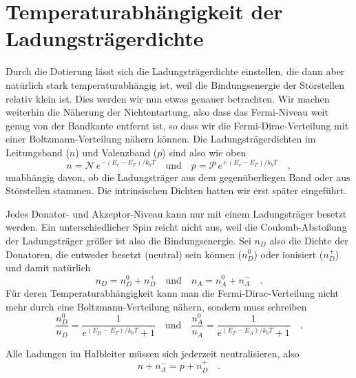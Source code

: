 \section{Temperaturabhängigkeit der Ladungsträgerdichte}

Durch die Dotierung lässt sich die Ladungsträgerdichte einstellen, die dann aber natürlich stark temperaturabhängig ist, weil die Bindungsenergie der Störstellen relativ klein ist. Dies werden wir nun etwas genauer betrachten. Wir machen weiterhin die Näherung der Nichtentartung, also dass das Fermi-Niveau weit genug von der Bandkante entfernt ist, so dass wir die Fermi-Dirac-Verteilung mit einer Boltzmann-Verteilung nähern können. Die Ladungsträgerdichten im Leitungsband ($n$) und Valenzband ($p$) sind also wie oben
\begin{equation}
    n  = \mathcal{N} \, e^{- (E_c - E_F) / k_b T} \quad \text{und} \quad   
    p =  \mathcal{P} \, e^{+ (E_v - E_F) / k_b T} \quad , \label{eq:5_np_eff}
\end{equation}
unabhängig davon, ob die Ladungsträger aus dem gegenüberliegen Band oder aus Störstellen stammen. Die intrinsischen Dichten hatten wir erst später eingeführt.

Jedes Donator- und Akzeptor-Niveau kann nur mit einem Ladungsträger besetzt werden. Ein unterschiedlicher Spin reicht nicht aus, weil die Coulomb-Abstoßung der Ladungsträger größer ist also die Bindungsenergie. Sei $n_D$ also die Dichte der Donatoren, die entweder besetzt (neutral) sein können ($n_D^0$) oder ionisiert  ($n_D^+$) und damit natürlich
\begin{equation}
    n_D = n_D^0 + n_D^+ \quad \text{und} \quad   n_A = n_A^0 + n_A^-   \quad .
\end{equation}
Für deren Temperaturabhängigkeit kann man die Fermi-Dirac-Verteilung nicht mehr durch eine Boltzmann-Verteilung nähern, sondern muss schreiben
\begin{equation}
    \frac{n_D^0}{n_D} = \frac{1}{e^{(E_D - E_F)/ k_b T } +1}
    \quad \text{und} \quad 
    \frac{n_A^0}{n_A} = \frac{1}{e^{(E_F - E_A)/ k_b T } +1} \quad .
\end{equation}

Alle Ladungen im Halbleiter müssen sich jederzeit neutralisieren, also 
\begin{equation}
    n + n_A^- = p + n_D^+ \quad .
\end{equation}

